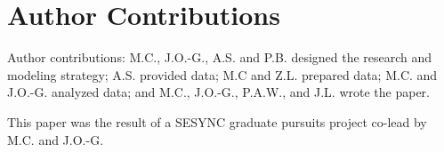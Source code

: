 \documentclass[fleqn,10pt]{wlscirep}
\begin{document}


\section*{Author Contributions}
Author contributions: M.C., J.O.-G., A.S. and P.B. designed the research and modeling strategy; A.S. provided data; M.C and Z.L. prepared data; M.C. and J.O.-G. analyzed data; and M.C., J.O.-G., P.A.W., and J.L. wrote the paper.

\noindent This paper was the result of a SESYNC graduate pursuits project co-lead by M.C. and J.O.-G.
\end{document}
